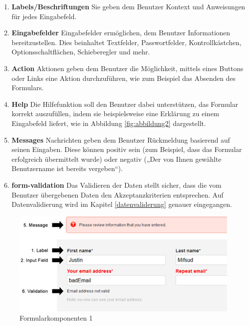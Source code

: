 \begin{enumerate}

    \item \textbf{Labels/Beschriftungen} Sie geben dem Benutzer Kontext und Anweisungen für jedes Eingabefeld.
    
    \item \textbf{Eingabefelder} Eingabefelder ermöglichen, dem Benutzer Informationen bereitzustellen. Dies beinhaltet Textfelder, Passwortfelder, Kontrollkästchen, Optionsschaltflächen, Schieberegler und mehr.
    
    \item \textbf{Action} Aktionen geben dem Benutzer die Möglichkeit, mittels eines Buttons oder Links eine Aktion durchzuführen, wie zum Beispiel das Absenden des Formulars.

    \item \textbf{Help} Die Hilfefunktion soll den Benutzer dabei unterstützen, das Formular korrekt auszufüllen, indem sie beispielsweise eine Erklärung zu einem Eingabefeld liefert, wie in Abbildung \ref{fig:abbildung2} dargestellt.
    
    \item \textbf{Messages} Nachrichten geben dem Benutzer Rückmeldung basierend auf seinen Eingaben. Diese können positiv sein (zum Beispiel, dass das Formular erfolgreich übermittelt wurde) oder negativ („Der von Ihnen gewählte Benutzername ist bereits vergeben“).

    \item \textbf{\gls{form-validation}} Das Validieren der Daten stellt sicher, dass die vom Benutzer übergebenen Daten den Akzeptanzkriterien entsprechen. Auf Datenvalidierung wird im Kapitel \ref{datenvaliderung} genauer eingegangen.
    
\end{enumerate}

\begin{figure}
    \centering
    \includegraphics[width=0.75\linewidth]{images/formularKomponenten1.png}
    \caption{Formularkomponenten 1 \cite{mifsud2011extensive}}
    \label{fig:abbildung1}
\end{figure}

